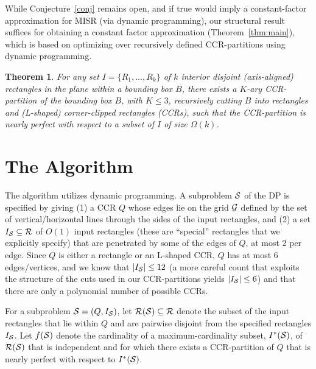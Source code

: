 \documentclass{article}
\newtheorem{theorem}{Theorem}[section]
\begin{document}
While Conjecture~\ref{conj} remains open, and if true would imply a
constant-factor approximation for MISR (via dynamic programming), our
structural result suffices for obtaining a constant factor
approximation (Theorem~\ref{thm:main}), which is based on optimizing
over recursively defined CCR-partitions using dynamic programming.

\begin{theorem}\label{thm:structure}
  For any set $I=\{R_1,\ldots,R_k\}$ of $k$ interior disjoint
  (axis-aligned) rectangles in the plane within a bounding box $B$,
  there exists a $K$-ary CCR-partition of the bounding box $B$, with
  $K\leq 3$, recursively cutting $B$ into rectangles and (L-shaped) corner-clipped rectangles
  (CCRs), such that the CCR-partition is nearly perfect with
  respect to a subset of $I$ of size $\Omega(k)$. %
\end{theorem}



\section{The Algorithm}

The algorithm utilizes dynamic programming.  A subproblem ${\cal S}$
of the DP is specified by giving (1) a CCR $Q$ whose edges lie on the
grid ${\cal G}$ defined by the set of vertical/horizontal lines
through the sides of the input rectangles, and (2) a set $I_{\cal
  S}\subseteq {\cal R}$ of $O(1)$ input rectangles (these are
``special'' rectangles that we explicitly specify) that are penetrated
by some of the edges of $Q$, at most 2 per edge. %
%
Since $Q$ is either a rectangle or an L-shaped CCR, $Q$ has at most 6
edges/vertices, and we know that $|I_{\cal S}|\leq 12$ (a more careful count that exploits the structure of the cuts used in our CCR-partitions yields $|I_{\cal S}|\leq 6$) and that there are
only a polynomial number of possible CCRs.
%

For a subproblem ${\cal S}=(Q,I_{\cal S})$, let ${\cal R}({\cal
  S})\subseteq {\cal R}$ denote the subset of the input rectangles
that lie within $Q$ and are pairwise disjoint from the specified
rectangles $I_{\cal S}$.
%
Let $f({\cal S})$ denote the cardinality of a maximum-cardinality subset,
$I^*({\cal S})$, of ${\cal R}({\cal S})$ that is independent and for which there
exists a CCR-partition of $Q$ that is nearly perfect with respect to $I^*({\cal S})$.
%
\end{document}
